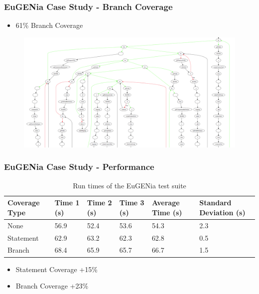 \begin{frame}
\frametitle{EuGENia Case Study - Branch Coverage}
\begin{itemize}
\item 61\% Branch Coverage
\end{itemize}

\begin{figure}
	\includegraphics[scale=0.3]{./presentation/images/eugenia_branch_coverage.png}
\end{figure}
\end{frame}

\begin{frame}
\frametitle{EuGENia Case Study - Performance}
\begin{table}
\centering
    \begin{tabular}{|p{0.75in} | p{0.5in} |p{0.5in} |p{0.5in} |p{0.5in} |p{0.65in} |} \hline
    Coverage Type & Time 1 (s) & Time 2 (s) & Time 3 (s) & Average Time (s) & Standard Deviation (s) \\\hline
    None          & 56.9             & 52.4             & 53.6             & 54.3                   & 2.3                          \\\hline
    Statement     & 62.9             & 63.2             & 62.3             & 62.8                   & 0.5                          \\\hline
    Branch        & 68.4             & 65.9             & 65.7             & 66.7                   & 1.5                          \\\hline
    \end{tabular}
    \caption{Run times of the EuGENia test suite}
    \label{tab:runTimes}
\end{table}
\begin{itemize}
\item Statement Coverage +15\%
\item Branch Coverage +23\%
\end{itemize}
\end{frame}

